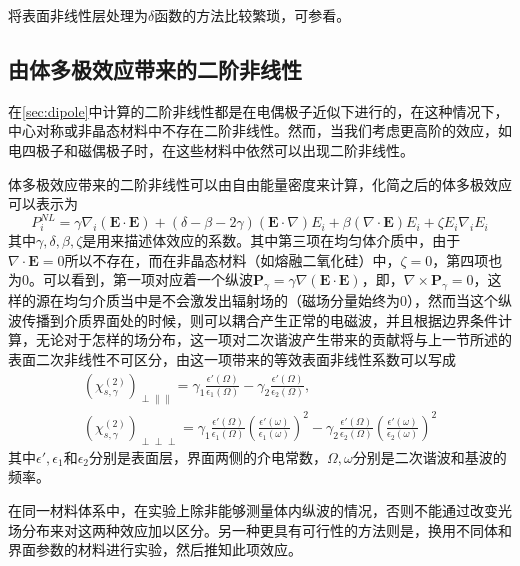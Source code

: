 \documentclass[UTF8,a4paper,cs4size,hyperref]{ctexart}
\begin{document}
将表面非线性层处理为$\delta$函数的方法比较繁琐，可参看\cite{kozyreff2008whispering}。

\subsection{由体多极效应带来的二阶非线性}
在\ref{sec:dipole}中计算的二阶非线性都是在电偶极子近似下进行的，在这种情况下，中心对称或非晶态材料中不存在二阶非线性。然而，当我们考虑更高阶的效应，如电四极子和磁偶极子时，在这些材料中依然可以出现二阶非线性。

体多极效应带来的二阶非线性可以由自由能量密度来计算\cite{bloembergen1965nonlinear,shen1984principles}，化简之后的体多极效应可以表示为
\begin{equation}
P^{NL}_i = \gamma\nabla_i(\mathbf{E}\cdot\mathbf{E})+(\delta-\beta-2\gamma)(\mathbf{E}\cdot\nabla)E_i+\beta(\nabla \cdot \mathbf{E})E_i+\zeta E_i\nabla_iE_i
\label{eq:surfaceN}
\end{equation}
其中$\gamma, \delta, \beta, \zeta$是用来描述体效应的系数。其中第三项在均匀体介质中，由于$\nabla \cdot \mathbf{E}=0$所以不存在，而在非晶态材料（如熔融二氧化硅）中，$\zeta=0$，第四项也为0。可以看到，第一项对应着一个纵波$\mathbf{P}_\gamma =  \gamma\nabla(\mathbf{E}\cdot\mathbf{E})$，即，$\nabla \times \mathbf{P}_\gamma = 0$，这样的源在均匀介质当中是不会激发出辐射场的（磁场分量始终为0），然而当这个纵波传播到介质界面处的时候，则可以耦合产生正常的电磁波，并且根据边界条件计算，无论对于怎样的场分布，这一项对二次谐波产生带来的贡献将与上一节所述的表面二次非线性不可区分\cite{sipe1987new}，由这一项带来的等效表面非线性系数可以写成\cite{heinz1991second}
\begin{gather}
(\chi^{(2)}_{s,\gamma})_{\perp \parallel \parallel} = \gamma_1\frac{\epsilon '(\Omega)}{\epsilon_1(\Omega)}-\gamma_2\frac{\epsilon '(\Omega)}{\epsilon_2(\Omega)}, \\
(\chi^{(2)}_{s,\gamma})_{\perp \perp \perp} = \gamma_1\frac{\epsilon '(\Omega)}{\epsilon_1(\Omega)}(\frac{\epsilon '(\omega)}{\epsilon_1(\omega)})^2-\gamma_2\frac{\epsilon '(\Omega)}{\epsilon_2(\Omega)}(\frac{\epsilon '(\omega)}{\epsilon_2(\omega)})^2
\end{gather}
其中$\epsilon ', \epsilon_1$和$\epsilon_2$分别是表面层，界面两侧的介电常数，$\Omega, \omega$分别是二次谐波和基波的频率。

在同一材料体系中，在实验上除非能够测量体内纵波的情况，否则不能通过改变光场分布来对这两种效应加以区分。另一种更具有可行性的方法则是，换用不同体和界面参数的材料进行实验，然后推知此项效应。
\end{document}
